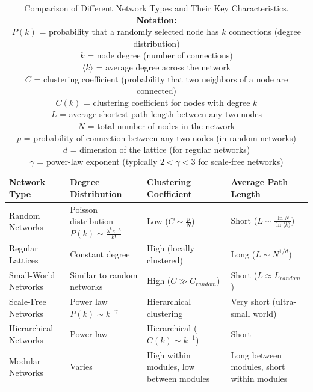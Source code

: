 \begin{table}[htbp]
    \centering
    \begin{tabular}{p{2.5cm}|p{3cm}|p{3cm}|p{3cm}}
        \hline
        \textbf{Network Type} & \textbf{Degree Distribution} & \textbf{Clustering Coefficient} & \textbf{Average Path Length} \\
        \hline
        Random Networks & Poisson distribution $P(k) \sim \frac{\lambda^k e^{-\lambda}}{k!}$ & Low ($C \sim \frac{p}{N}$) & Short ($L \sim \frac{\ln N}{\ln \langle k \rangle}$) \\
        \hline
        Regular Lattices & Constant degree & High (locally clustered) & Long ($L \sim N^{1/d}$) \\
        \hline
        Small-World Networks & Similar to random networks & High ($C \gg C_{random}$) & Short ($L \approx L_{random}$) \\
        \hline
        Scale-Free Networks & Power law $P(k) \sim k^{-\gamma}$ & Hierarchical clustering & Very short (ultra-small world) \\
        \hline
        Hierarchical Networks & Power law & Hierarchical ($C(k) \sim k^{-1}$) & Short \\
        \hline
        Modular Networks & Varies & High within modules, low between modules & Long between modules, short within modules \\
        \hline
    \end{tabular}
    \caption{Comparison of Different Network Types and Their Key Characteristics.
        \textbf{Notation:}\\
        $P(k)$ = probability that a randomly selected node has $k$ connections (degree distribution)\\
        $k$ = node degree (number of connections)\\
        $\langle k \rangle$ = average degree across the network\\
        $C$ = clustering coefficient (probability that two neighbors of a node are connected)\\
        $C(k)$ = clustering coefficient for nodes with degree $k$\\
        $L$ = average shortest path length between any two nodes\\
        $N$ = total number of nodes in the network\\
        $p$ = probability of connection between any two nodes (in random networks)\\
        $d$ = dimension of the lattice (for regular networks)\\
        $\gamma$ = power-law exponent (typically $2 < \gamma < 3$ for scale-free networks)}
    \label{tab:network_types}
\end{table}

